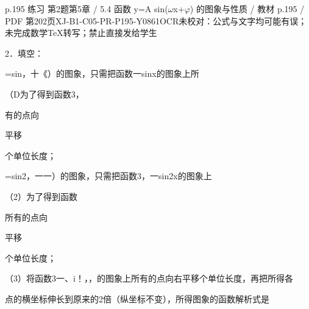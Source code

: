 \begin{bankitem}{p.195 练习 第2题}{第5章 / 5.4 函数 y=A sin(\ensuremath{\omega}x+\ensuremath{\varphi}) 的图象与性质 / 教材 p.195 / PDF 第202页}{XJ-B1-C05-PR-P195-Y0861}{OCR未校对：公式与文字均可能有误；未完成数学TeX转写；禁止直接发给学生}
\begin{ocrdraft}
\par
2．填空：
\par
=sin，十《）的图象，只需把函数一sinx的图象上所
\par
（D为了得到函数3，
\par
有的点向
\par
平移
\par
个单位长度；
\par
=sin2，一一）的图象，只需把函数3，一sin2x的图象上
\par
（2）为了得到函数
\par
所有的点向
\par
平移
\par
个单位长度；
\par
（3）将函数3一、i！，，的图象上所有的点向右平移个单位长度，再把所得各
\par
点的横坐标伸长到原来的2倍（纵坐标不变），所得图象的函数解析式是
\end{ocrdraft}
\end{bankitem}
